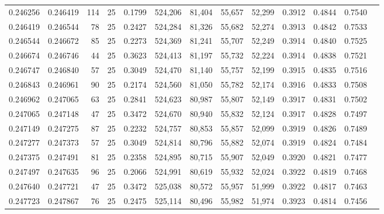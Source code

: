 \begin{tabular}{rrrrrrrrrrrrr}
0.246256 & 0.246419 &   114 &  25 &                                     0.1799 & 524,206 &  81,404 &  55,657 &  52,299 & 0.3912 & 0.4844 & 0.7540 \\
0.246419 & 0.246544 &    78 &  25 &                                     0.2427 & 524,284 &  81,326 &  55,682 &  52,274 & 0.3913 & 0.4842 & 0.7533 \\
0.246544 & 0.246672 &    85 &  25 &                                     0.2273 & 524,369 &  81,241 &  55,707 &  52,249 & 0.3914 & 0.4840 & 0.7525 \\
0.246674 & 0.246746 &    44 &  25 &                                     0.3623 & 524,413 &  81,197 &  55,732 &  52,224 & 0.3914 & 0.4838 & 0.7521 \\
0.246747 & 0.246840 &    57 &  25 &                                     0.3049 & 524,470 &  81,140 &  55,757 &  52,199 & 0.3915 & 0.4835 & 0.7516 \\
0.246843 & 0.246961 &    90 &  25 &                                     0.2174 & 524,560 &  81,050 &  55,782 &  52,174 & 0.3916 & 0.4833 & 0.7508 \\
0.246962 & 0.247065 &    63 &  25 &                                     0.2841 & 524,623 &  80,987 &  55,807 &  52,149 & 0.3917 & 0.4831 & 0.7502 \\
0.247065 & 0.247148 &    47 &  25 &                                     0.3472 & 524,670 &  80,940 &  55,832 &  52,124 & 0.3917 & 0.4828 & 0.7497 \\
0.247149 & 0.247275 &    87 &  25 &                                     0.2232 & 524,757 &  80,853 &  55,857 &  52,099 & 0.3919 & 0.4826 & 0.7489 \\
0.247277 & 0.247373 &    57 &  25 &                                     0.3049 & 524,814 &  80,796 &  55,882 &  52,074 & 0.3919 & 0.4824 & 0.7484 \\
0.247375 & 0.247491 &    81 &  25 &                                     0.2358 & 524,895 &  80,715 &  55,907 &  52,049 & 0.3920 & 0.4821 & 0.7477 \\
0.247497 & 0.247635 &    96 &  25 &                                     0.2066 & 524,991 &  80,619 &  55,932 &  52,024 & 0.3922 & 0.4819 & 0.7468 \\
0.247640 & 0.247721 &    47 &  25 &                                     0.3472 & 525,038 &  80,572 &  55,957 &  51,999 & 0.3922 & 0.4817 & 0.7463 \\
0.247723 & 0.247867 &    76 &  25 &                                     0.2475 & 525,114 &  80,496 &  55,982 &  51,974 & 0.3923 & 0.4814 & 0.7456 \\

\end{tabular}
